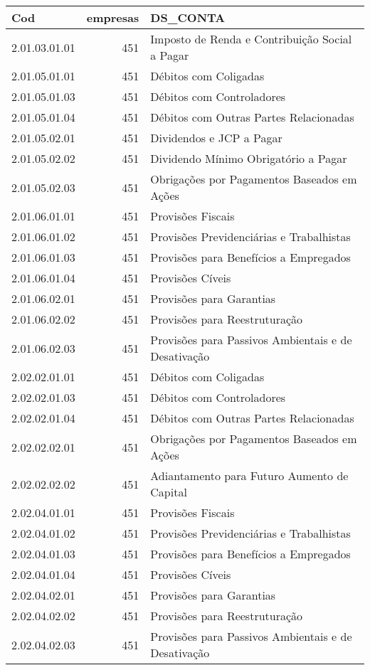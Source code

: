 \begin{table}[ht]
\centering
\begin{tabular}{lrl}
  \hline
Cod & empresas & DS\_CONTA \\ 
  \hline
2.01.03.01.01 & 451 & Imposto de Renda e Contribuição Social a Pagar \\ 
  2.01.05.01.01 & 451 & Débitos com Coligadas \\ 
  2.01.05.01.03 & 451 & Débitos com Controladores \\ 
  2.01.05.01.04 & 451 & Débitos com Outras Partes Relacionadas \\ 
  2.01.05.02.01 & 451 & Dividendos e JCP a Pagar \\ 
  2.01.05.02.02 & 451 & Dividendo Mínimo Obrigatório a Pagar \\ 
  2.01.05.02.03 & 451 & Obrigações por Pagamentos Baseados em Ações \\ 
  2.01.06.01.01 & 451 & Provisões Fiscais \\ 
  2.01.06.01.02 & 451 & Provisões Previdenciárias e Trabalhistas \\ 
  2.01.06.01.03 & 451 & Provisões para Benefícios a Empregados \\ 
  2.01.06.01.04 & 451 & Provisões Cíveis \\ 
  2.01.06.02.01 & 451 & Provisões para Garantias \\ 
  2.01.06.02.02 & 451 & Provisões para Reestruturação \\ 
  2.01.06.02.03 & 451 & Provisões para Passivos Ambientais e de Desativação \\ 
  2.02.02.01.01 & 451 & Débitos com Coligadas \\ 
  2.02.02.01.03 & 451 & Débitos com Controladores \\ 
  2.02.02.01.04 & 451 & Débitos com Outras Partes Relacionadas \\ 
  2.02.02.02.01 & 451 & Obrigações por Pagamentos Baseados em Ações \\ 
  2.02.02.02.02 & 451 & Adiantamento para Futuro Aumento de Capital \\ 
  2.02.04.01.01 & 451 & Provisões Fiscais \\ 
  2.02.04.01.02 & 451 & Provisões Previdenciárias e Trabalhistas \\ 
  2.02.04.01.03 & 451 & Provisões para Benefícios a Empregados \\ 
  2.02.04.01.04 & 451 & Provisões Cíveis \\ 
  2.02.04.02.01 & 451 & Provisões para Garantias \\ 
  2.02.04.02.02 & 451 & Provisões para Reestruturação \\ 
  2.02.04.02.03 & 451 & Provisões para Passivos Ambientais e de Desativação \\ 
   \hline
\end{tabular}
\end{table}

